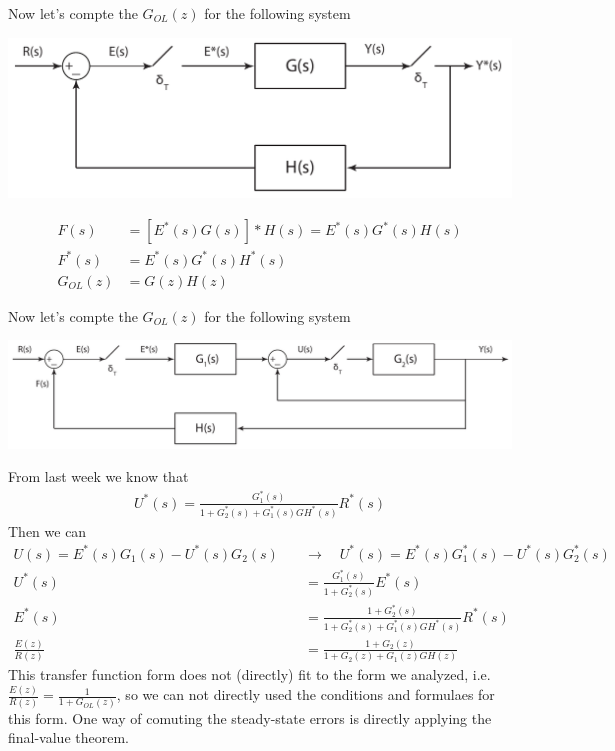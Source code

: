 \documentclass[twoside]{article}
\begin{document}
Now let's compte the $G_{OL}(z)$ for the following system

\begin{center}
\begin{minipage}[h]{0.6\linewidth}
    \begin{center}
      \includegraphics[width=\textwidth]{closed2}
    \end{center}
\end{minipage}
\end{center}

\begin{align*}
F(s) &= [ E^*(s) G(s) ]* H(s) = E^*(s) G^*(s) H(s) 
\\
F^*(s) &= E^*(s) G^*(s) H^*(s)
\\
G_{OL}(z) &= G(z) H(z)
\end{align*}

Now let's compte the $G_{OL}(z)$ for the following system

\begin{center}
\begin{minipage}[h]{\linewidth}
    \begin{center}
      \includegraphics[width=\textwidth]{closed3}
    \end{center}
\end{minipage}
\end{center}

From last week we know that
%
\begin{align*}
U^*(s) = \frac{G_1^*(s)}{1 + G_2^*(s) + G_1^*(s) GH^*(s)} R^*(s)
\end{align*}
%
Then we can 
%
\begin{align*}
U(s) = E^*(s) G_1(s) - U^*(s) G_2(s) \quad &\rightarrow \quad U^*(s) =
       E^*(s) G_1^*(s) - U^*(s) G^*_2(s)
\\
U^*(s) &= \frac{G_1^*(s)}{1 + G^*_2(s)} E^*(s)
\\
E^*(s) &= \frac{1 + G_2^*(s)}{1 + G_2^*(s) + G_1^*(s) GH^*(s)} R^*(s)
\\
\frac{E(z)}{R(z)} &= \frac{1 + G_2(z)}{1 + G_2(z) + G_1(z) GH(z)} 
\end{align*}
%
This transfer function form does not (directly) fit to the form we analyzed,
i.e. $\frac{E(z)}{R(z)} = \frac{1}{1 + G_{OL}(z) }$, so we can not
directly used the conditions and formulaes for this form. One way of
comuting the steady-state errors is directly applying the final-value theorem.
\end{document}
